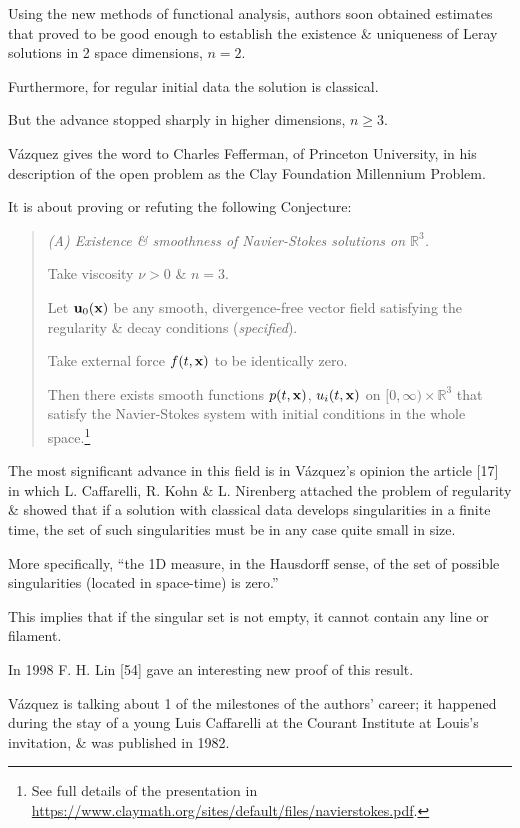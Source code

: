 \documentclass{article}
\begin{document}
Using the new methods of functional analysis, authors soon obtained estimates that proved to be good enough to establish the existence \& uniqueness of Leray solutions in 2 space dimensions, $n = 2$.

Furthermore, for regular initial data the solution is classical.

But the advance stopped sharply in higher dimensions, $n\ge 3$.

V\'azquez gives the word to Charles Fefferman, of Princeton University, in his description of the open problem as the Clay Foundation Millennium Problem.

It is about proving or refuting the following Conjecture:
\begin{quotation}\it
	(A) Existence \& smoothness of Navier-Stokes solutions on $\mathbb{R}^3$.
	
	Take viscosity $\nu > 0$ \& $n = 3$.
	
	Let ${\bf u}_0({\bf x})$ be any smooth, divergence-free vector field satisfying the regularity \& decay conditions (\emph{specified}).
	
	Take external force $f(t,{\bf x})$ to be identically zero.
	
	Then there exists smooth functions $p(t,{\bf x})$, $u_i(t,{\bf x})$ on $[0,\infty)\times\mathbb{R}^3$ that satisfy the Navier-Stokes system with initial conditions in the whole space.\footnote{See full details of the presentation in \url{https://www.claymath.org/sites/default/files/navierstokes.pdf}.}
\end{quotation}
The most significant advance in this field is in V\'azquez's opinion the article [17] in which L. Caffarelli, R. Kohn \& L. Nirenberg attached the problem of regularity \& showed that if a solution with classical data develops singularities in a finite time, the set of such singularities must be in any case quite small in size.

More specifically, ``the 1D measure, in the Hausdorff sense, of the set of possible singularities (located in space-time) is zero.''

This implies that if the singular set is not empty, it cannot contain any line or filament.

In 1998 F. H. Lin [54] gave an interesting new proof of this result.

%
V\'azquez is talking about 1 of the milestones of the authors' career; it happened during the stay of a young Luis Caffarelli at the Courant Institute at Louis's invitation, \& was published in 1982.
\end{document}
